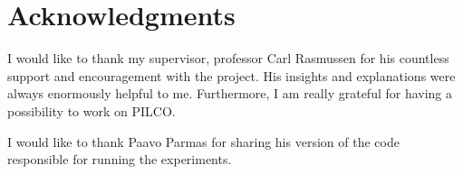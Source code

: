 \section*{Acknowledgments}

I would like to thank my supervisor, professor Carl Rasmussen for his countless support and encouragement with the project. His insights and explanations were always enormously helpful to me. Furthermore, I am really grateful for having a possibility to work on PILCO.

\noindent I would like to thank Paavo Parmas for sharing his version of the code responsible for running the experiments. 

